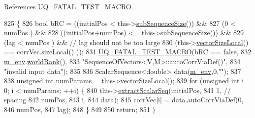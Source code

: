 References U\-Q\-\_\-\-F\-A\-T\-A\-L\-\_\-\-T\-E\-S\-T\-\_\-\-M\-A\-C\-R\-O.


\begin{DoxyCode}
825 \{
826   \textcolor{keywordtype}{bool} bRC = ((initialPos              <  this->\hyperlink{class_q_u_e_s_o_1_1_sequence_of_vectors_a0224bd3e961d86af5d2886301c0c2b86}{subSequenceSize}()) &&
827               (0                       <  numPos                 ) &&
828               ((initialPos+numPos)     <= this->\hyperlink{class_q_u_e_s_o_1_1_sequence_of_vectors_a0224bd3e961d86af5d2886301c0c2b86}{subSequenceSize}()) &&
829               (lag                     <  numPos                 ) && \textcolor{comment}{// lag should not be too large}
830               (this->\hyperlink{class_q_u_e_s_o_1_1_base_vector_sequence_a2fefedf9e5b90f22881103b3f92555f6}{vectorSizeLocal}() == corrVec.sizeLocal()    ));
831   \hyperlink{_defines_8h_a56d63d18d0a6d45757de47fcc06f574d}{UQ\_FATAL\_TEST\_MACRO}(bRC == \textcolor{keyword}{false},
832                       \hyperlink{class_q_u_e_s_o_1_1_base_vector_sequence_a8e8824d2a63c5a43bcc6473e3a0491e8}{m\_env}.\hyperlink{class_q_u_e_s_o_1_1_base_environment_a78b57112bbd0e6dd0e8afec00b40ffa7}{worldRank}(),
833                       \textcolor{stringliteral}{"SequenceOfVectors<V,M>::autoCorrViaDef()"},
834                       \textcolor{stringliteral}{"invalid input data"});
835 
836   ScalarSequence<double> data(\hyperlink{class_q_u_e_s_o_1_1_base_vector_sequence_a8e8824d2a63c5a43bcc6473e3a0491e8}{m\_env},0,\textcolor{stringliteral}{""});
837 
838   \textcolor{keywordtype}{unsigned} \textcolor{keywordtype}{int} numParams = this->\hyperlink{class_q_u_e_s_o_1_1_base_vector_sequence_a2fefedf9e5b90f22881103b3f92555f6}{vectorSizeLocal}();
839   \textcolor{keywordflow}{for} (\textcolor{keywordtype}{unsigned} \textcolor{keywordtype}{int} i = 0; i < numParams; ++i) \{
840     this->\hyperlink{class_q_u_e_s_o_1_1_sequence_of_vectors_ac977b3b26a6af2ae727671f1246262fd}{extractScalarSeq}(initialPos,
841                            1, \textcolor{comment}{// spacing}
842                            numPos,
843                            i,
844                            data);
845     corrVec[i] = data.autoCorrViaDef(0,
846                                      numPos,
847                                      lag);
848   \}
849 
850   \textcolor{keywordflow}{return};
851 \}
\end{DoxyCode}
